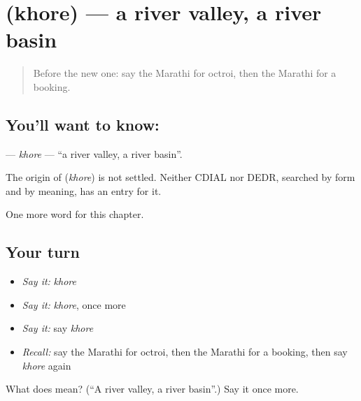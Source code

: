 \section[\texorpdfstring{\mr{खोरे} (khore)}{खोरे (khore)}]{ (khore) — a river valley, a river basin}

\label{lesson:MR-C236-khore}



\begin{quote}
Before the new one: say the Marathi for octroi, then the Marathi for a booking.
\end{quote}

\subsection*{You'll want to know: }
\textbf{} — \emph{khore} — \textquotedblleft{}a river valley, a river basin\textquotedblright{}.

\begin{cousinweb}
The origin of \textbf{} (\emph{khore}) is not settled. Neither CDIAL nor DEDR, searched by form and by meaning, has an entry for it.
\end{cousinweb}

\begin{grammarlens}[title={What you've built}]
One more word for this chapter.
\end{grammarlens}

\subsection*{Your turn}
\begin{itemize}
\raggedright
  \item \emph{Say it:} \emph{khore}
  \item \emph{Say it:} \emph{khore}, once more
  \item \emph{Say it:} say \emph{khore}
  \item \emph{Recall:} say the Marathi for octroi, then the Marathi for a booking, then say \emph{khore} again
\end{itemize}

\begin{tcolorbox}[breakable,colback=teal!4,colframe=teal!35!black,title={Before you move on}]
What does  mean? (\textquotedblleft{}A river valley, a river basin\textquotedblright{}.) Say it once more.
\end{tcolorbox}
